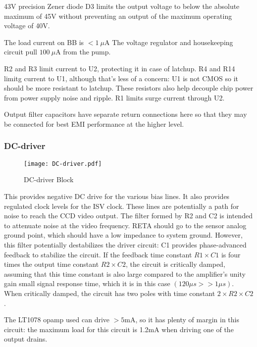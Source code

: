 43V precision Zener diode D3 limits the output voltage to below the absolute maximum of 45V without preventing an output of the maximum operating voltage of 40V.

The load current on BB is $<1\ \mu$A The voltage regulator and housekeeping circuit pull $100\ \mu$A from the pump.

R2 and R3 limit current to U2, protecting it in case of latchup. R4 and R14 limitg current to U1, although that's less of a concern: U1 is not CMOS so it should be more resistant to latchup. These resistors also help decouple chip power from power supply noise and ripple. R1 limits surge current through U2.

Output filter capacitors have separate return connections here so that they may be connected for best EMI performance at the higher level.




\subsubsection{DC-driver}
   \begin{figure}
   \begin{center}
   \texttt{[image: DC-driver.pdf]}
   \end{center}
   \caption{DC-driver Block}
   \end{figure}

This provides negative DC drive for the various bias lines. It also provides regulated clock levels for the ISV clock. These lines are potentially a path for noise to reach the CCD video output. The filter formed by R2 and C2 is intended to attenuate noise at the video frequency. RETA should go to the sensor analog ground point, which should have a low impedance to system ground.
However, this filter potentially destabilizes the driver circuit: C1 provides phase-advanced feedback to stabilize the circuit. If the feedback time constant $R1\times C1$ is four times the output time constant $R2\times C2$, the circuit is critically damped, assuming that this time constant is also large compared to the amplifier's unity gain small signal response time, which it is in this case $(120\mu s>>1 \mu s)$. When critically damped, the circuit has two poles with time constant $2\times R2\times C2$.

The LT1078 opamp used can drive $>5$mA, so it has plenty of margin in this circuit: the maximum load for this circuit is 1.2mA when driving one of the output drains. 

